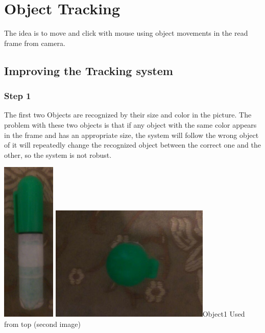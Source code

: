\documentclass{report}
\begin{document}
\section{Object Tracking}
The idea is to move and click with mouse using object movements in the read frame from camera. 
\subsection{Improving the Tracking system}
\subsubsection{Step 1}
The first two Objects are recognized by their size and color in the picture. The problem with these two objects is that if any object with the same color appears in the frame and has an appropriate size, the system will follow the wrong object of it will repeatedly change the recognized object between the correct one and the other, so the system is not robust. \newline
\begin{center}
\includegraphics[width=1in]{Object1.jpg}
\includegraphics[width=3in]{Object1-2.jpg}\newline \figurename{Object1} Used from top (second image)	
\end{center}
\end{document}
